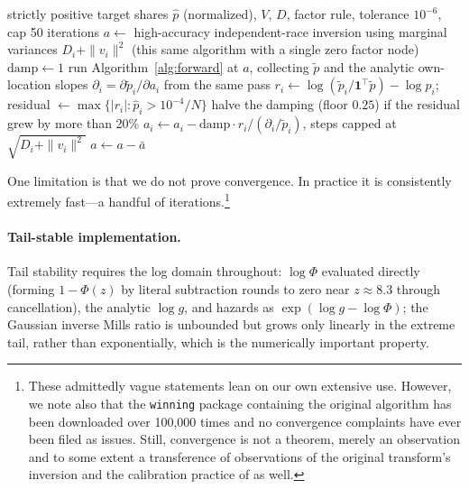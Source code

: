 \documentclass[12pt]{article}
\theoremstyle{remark}
\begin{document}
\begin{algorithm}[H]
\caption{Calibration (damped Jacobi quasi-Newton)}
\label{alg:calibrate}
\begin{algorithmic}[1]
\Require strictly positive target shares $\hat p$ (normalized), $V$, $D$,
factor rule, tolerance $10^{-6}$, cap 50 iterations
\State $a \gets$ high-accuracy independent-race inversion using
marginal variances $D_i + \|v_i\|^2$ (this same algorithm with a
single zero factor node) 
\State $\mathrm{damp} \gets 1$
\Repeat
  \State run Algorithm~\ref{alg:forward} at $a$, collecting $\tilde p$
  and the analytic own-location slopes $\partial_i = \partial \tilde
  p_i / \partial a_i$ from the same pass
  \State $r_i \gets \log(\tilde p_i / \mathbf{1}^\top \tilde p) -
  \log \hat p_i$; residual $\gets \max\{|r_i| : \hat p_i >
  10^{-4}/N\}$
  \State halve the damping (floor $0.25$) if the residual grew by more
  than 20\%
  \State $a_i \gets a_i - \mathrm{damp} \cdot r_i / (\partial_i /
  \tilde p_i)$, steps capped at $\sqrt{D_i + \|v_i\|^2}$
  \State $a \gets a - \bar a$ 
\end{algorithmic}
\end{algorithm}

One limitation is that we do not prove convergence. In practice it is consistently extremely fast---a handful of iterations.\footnote{These admittedly vague statements lean on our own extensive use. However, we note also that the \texttt{winning} package \citep{winningpkg} containing the original algorithm has been downloaded over 100,000 times and no convergence complaints have ever been filed as issues. Still, convergence is not a theorem, merely an observation and to some extent a transference of observations of the original transform's inversion \citep{cotton2021} and the calibration practice of
\citet{allocationpkg} as well.}

\paragraph{Tail-stable implementation.} Tail stability requires the log
domain throughout: $\log \Phi$ evaluated directly (forming $1 - \Phi(z)$
by literal subtraction rounds to zero near $z \approx 8.3$ through
cancellation), the analytic $\log g$, and hazards as $\exp(\log g - \log
\Phi)$; the Gaussian inverse Mills ratio is unbounded but grows only
linearly in the extreme tail, rather than exponentially, which is the
numerically important property.
\end{document}
